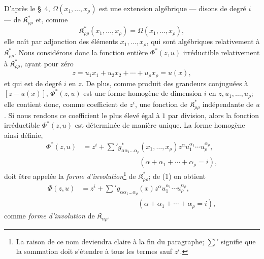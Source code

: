 \documentclass[11pt]{article}
\providecommand{\Kfield}{\mathfrak{K}}
\begin{document}
D'après le \S\ 4, $\Omega(x_1,\ldots,x_\rho)$ est une extension algébrique --- disons de degré $i$ --- de $\Kfield^*_{\rho\rho}$ et, comme
\[
  \Kfield^*_{\rho\rho}(x_1,\ldots,x_\rho)=\Omega(x_1,\ldots,x_\rho),
\]
elle naît par adjonction des éléments $x_1,\ldots,x_\rho$, qui sont algébriques relativement à $\Kfield^*_{\rho\rho}$. Nous considérons donc la fonction entière $\Phi^*(z,u)$ irréductible relativement à $\Kfield^*_{\rho\rho}$, ayant pour zéro
\[
  z=u_1x_1+u_2x_2+\cdots+u_\rho x_\rho=u(x),
\]
et qui est de degré $i$ en $z$. De plus, comme produit des grandeurs conjuguées à $[z-u(x)]$, $\Phi^*(z,u)$ est une forme homogène de dimension $i$ en $z,u_1,\ldots,u_\rho$; elle contient donc, comme coefficient de $z^i$, une fonction de $\Kfield^*_{\rho\rho}$ indépendante de $u$. Si nous rendons ce coefficient le plus élevé égal à $1$ par division, alors la fonction irréductible $\Phi^*(z,u)$ est déterminée de manière unique. La forme homogène ainsi définie,
\begin{equation}
\begin{aligned}
  \Phi^*(z,u)
  &=z^i+
    \sum{}' g^*_{\alpha\alpha_1\ldots\alpha_\rho}(x_1,
    \ldots,x_\rho)
    z^\alpha u_1^{\alpha_1}\cdots u_\rho^{\alpha_\rho},\\
  &\hspace{8em}(\alpha+\alpha_1+\cdots+\alpha_\rho=i),
\end{aligned}
\tag{1}
\end{equation}
doit être appelée la \emph{forme d'involution}\footnote{La raison de ce nom deviendra claire à la fin du paragraphe; $\sum'$ signifie que la sommation doit s'étendre à tous les termes sauf $z^i$.} de $\Kfield^*_{\rho\rho}$; de (1) on obtient
\begin{equation}
\begin{aligned}
  \Phi(z,u)
  &=z^i+
    \sum{}' g_{\alpha\alpha_1\ldots\alpha_\rho}(x)
    z^\alpha u_1^{\alpha_1}\cdots u_\rho^{\alpha_\rho},\\
  &\hspace{8em}(\alpha+\alpha_1+\cdots+\alpha_\rho=i),
\end{aligned}
\tag{2}
\end{equation}
comme \emph{forme d'involution} de $\Kfield_{n\rho}$.
\end{document}

